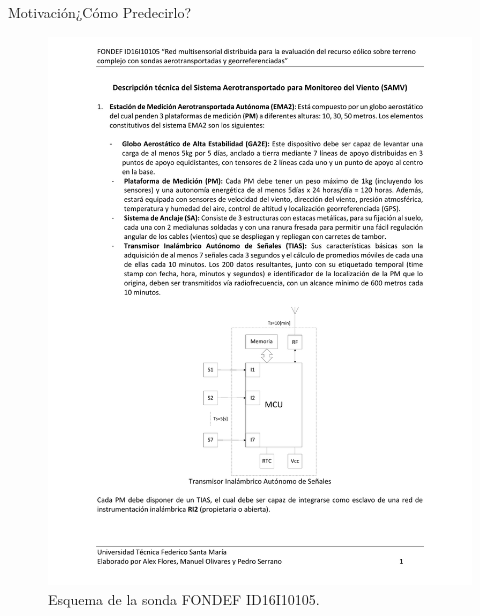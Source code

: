 \documentclass[mathserif,10pt]{beamer}
\begin{document}
\begin{frame}{Motivación}{¿Cómo Predecirlo?}
\begin{figure}[h]
\begin{minipage}{0.5\linewidth}
			\includegraphics[width=0.9\linewidth,page=5,trim={3cm 2.5cm 5cm 18.5cm},clip]{fig/01/descrp}
		\end{minipage}%
		\caption{Esquema de la sonda FONDEF ID16I10105.}
		\label{fig:01_sonda}
	\end{figure}
\end{frame}
\end{document}
